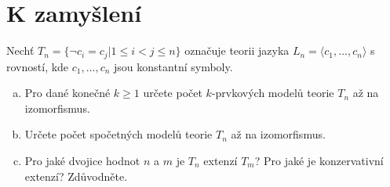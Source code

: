         
\section*{K zamyšlení}


\begin{problem}

    Nechť $T_n = \{\neg c_i = c_j | 1 \leq i < j \leq n\}$ označuje teorii jazyka $L_n = \langle c_1, \dots, c_n \rangle$ s rovností, kde $c_1, \dots, c_n$ jsou konstantní symboly.
    \begin{enumerate}[(a)]   
        \item Pro dané konečné $k \geq 1$ určete počet $k$-prvkových modelů teorie $T_n$ až na izomorfismus. 
        \item Určete počet spočetných modelů teorie $T_n$ až na izomorfismus. 
        \item Pro jaké dvojice hodnot $n$ a $m$ je $T_n$ extenzí $T_m$? Pro jaké je konzervativní extenzí? Zdůvodněte.
    \end{enumerate}

\end{problem}




